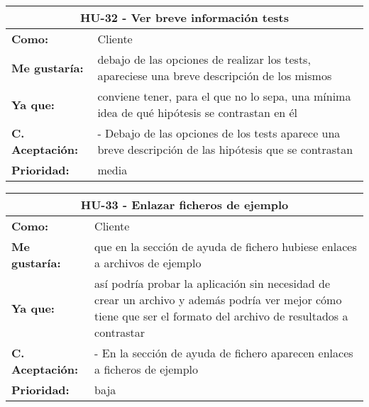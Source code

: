 \begin{table}[H]
	\begin{tabular}{| p{3cm}| p{12cm} |}
		\hline
		\multicolumn{2}{|c|}{\textbf{HU-32} - Ver breve información tests} \\ \hline
		\textbf{Como:} & Cliente \\ \hline
		\textbf{Me gustaría:} & debajo de las opciones de realizar los tests, apareciese una breve descripción de los mismos \\ \hline
		\textbf{Ya que:} & conviene tener, para el que no lo sepa, una mínima idea de qué hipótesis se contrastan en él \\ \hline
		\textbf{C. Aceptación:} & - Debajo de las opciones de los tests aparece una breve descripción de las hipótesis que se contrastan \\ \hline
		\textbf{\textbf{Prioridad:}} & media \\ \hline
	\end{tabular}
\end{table}


\begin{table}[H]
	\begin{tabular}{| p{3cm}| p{12cm} |}
		\hline
		\multicolumn{2}{|c|}{\textbf{HU-33} - Enlazar ficheros de ejemplo} \\ \hline
		\textbf{Como:} & Cliente \\ \hline
		\textbf{Me gustaría:} & que en la sección de ayuda de fichero hubiese enlaces a archivos de ejemplo \\ \hline
		\textbf{Ya que:} & así podría probar la aplicación sin necesidad de crear un archivo y además podría ver mejor cómo tiene que ser el formato del archivo de resultados a contrastar \\ \hline
		\textbf{C. Aceptación:} & - En la sección de ayuda de fichero aparecen enlaces a ficheros de ejemplo \\ \hline
		\textbf{\textbf{Prioridad:}} & baja \\ \hline
	\end{tabular}
\end{table}


